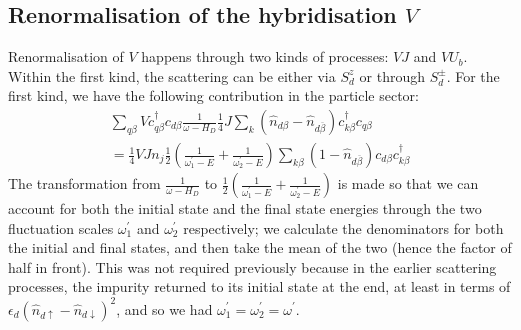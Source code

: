 \documentclass[reprint,superscriptaddress,floatfix]{revtex4-2}
\begin{document}
\subsection{Renormalisation of the hybridisation \(V\)}
Renormalisation of \(V\) happens through two kinds of processes: \(VJ\) and \(VU_b\). Within the first kind, the scattering can be either via \(S_d^z\) or through \(S_d^\pm\). For the first kind, we have the following contribution in the particle sector:
\begin{equation}\begin{aligned}
	\sum_{q\beta} Vc^\dagger_{q\beta} c_{d\beta} \frac{1}{\omega - H_D}\frac{1}{4}J \sum_{k} \left(\hat n_{d\beta} - \hat n_{d\overline\beta}\right) c^\dagger_{k\beta}c_{q\beta} \\
	= \frac{1}{4}V J n_j \frac{1}{2}\left(\frac{1}{\omega^\prime_1 - E} + \frac{1}{\omega^\prime_2 - E}\right)\sum_{k\beta} \left(1 - \hat n_{d\overline\beta}\right) c_{d\beta}c^\dagger_{k\beta}
\end{aligned}\end{equation}
The transformation from \(\frac{1}{\omega - H_D}\) to \(\frac{1}{2}\left(\frac{1}{\omega^\prime_1 - E} + \frac{1}{\omega^\prime_2 - E}\right)\) is made so that we can account for both the initial state and the final state energies through the two fluctuation scales \(\omega^\prime_1\) and \(\omega_2^\prime\) respectively; we calculate the denominators for both the initial and final states, and then take the mean of the two (hence the factor of half in front). This was not required previously because in the earlier scattering processes, the impurity returned to its initial state at the end, at least in terms of \(\epsilon_d \left( \hat n_{d \uparrow} - \hat n_{d \downarrow} \right)^2 \), and so we had \(\omega_1^\prime = \omega_2^\prime = \omega^\prime\).
\end{document}

